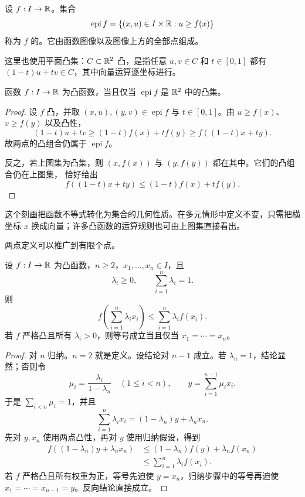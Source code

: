 \begin{definition}[上图集]
设 \(f:I\to\mathbb{R}\)。集合
\[
 \operatorname{epi}f
 =\{(x,u)\in I\times\mathbb{R}:u\ge f(x)\}
\]
称为 \(f\) 的。它由函数图像以及图像上方的全部点组成。
\end{definition}

这里也使用平面凸集：\(C\subset\mathbb{R}^2\) 凸，是指任意 \(u,v\in C\) 和 \(t\in[0,1]\) 都有 \((1-t)u+tv\in C\)，其中向量运算逐坐标进行。

\begin{proposition}[上图集刻画]
\label{prop:convex-epigraph-characterization}
函数 \(f:I\to\mathbb{R}\) 为凸函数，当且仅当 \(\operatorname{epi}f\) 是 \(\mathbb{R}^2\) 中的凸集。
\end{proposition}

\begin{proof}
设 \(f\) 凸，并取 \((x,u),(y,v)\in\operatorname{epi}f\) 与 \(t\in[0,1]\)。由
\(u\ge f(x)\)、\(v\ge f(y)\) 以及凸性，
\[
 (1-t)u+tv
 \ge (1-t)f(x)+tf(y)
 \ge f((1-t)x+ty).
\]
故两点的凸组合仍属于 \(\operatorname{epi}f\)。

反之，若上图集为凸集，则 \((x,f(x))\) 与 \((y,f(y))\) 都在其中。它们的凸组合仍在上图集，
恰好给出
\[
 f((1-t)x+ty)\le(1-t)f(x)+tf(y).
\]
\end{proof}

这个刻画把函数不等式转化为集合的几何性质。在多元情形中定义不变，只需把横坐标
\(x\) 换成向量；许多凸函数的运算规则也可由上图集直接看出。

两点定义可以推广到有限个点。

\begin{theorem}
\label{thm:finite-jensen}
设 \(f:I\to\mathbb{R}\) 为凸函数，\(n\ge 2\)，\(x_1,\dots,x_n\in I\)，且
\[
 \lambda_i\ge0,
 \qquad \sum_{i=1}^n\lambda_i=1.
\]
则
\begin{equation}
 f\!\left(\sum_{i=1}^n\lambda_i x_i\right)
 \le \sum_{i=1}^n\lambda_i f(x_i).
 \label{eq:finite-jensen}
\end{equation}
若 \(f\) 严格凸且所有 \(\lambda_i>0\)，则等号成立当且仅当 \(x_1=\cdots=x_n\)。
\end{theorem}

\begin{proof}
对 \(n\) 归纳。\(n=2\) 就是定义。设结论对 \(n-1\) 成立。若 \(\lambda_n=1\)，结论显然；否则令
\[
 \mu_i=\frac{\lambda_i}{1-\lambda_n}\quad(1\le i<n),
 \qquad y=\sum_{i=1}^{n-1}\mu_i x_i.
\]
于是 \(\sum_{i<n}\mu_i=1\)，并且
\[
 \sum_{i=1}^n\lambda_i x_i=(1-\lambda_n)y+\lambda_nx_n.
\]
先对 \(y,x_n\) 使用两点凸性，再对 \(y\) 使用归纳假设，得到
\[
 \begin{aligned}
 f((1-\lambda_n)y+\lambda_nx_n)
 &\le(1-\lambda_n)f(y)+\lambda_nf(x_n)\\
 &\le\sum_{i=1}^n\lambda_i f(x_i).
 \end{aligned}
\]
若 \(f\) 严格凸且所有权重为正，等号先迫使 \(y=x_n\)，归纳步骤中的等号再迫使 \(x_1=\cdots=x_{n-1}=y\)。反向结论直接成立。
\end{proof}

